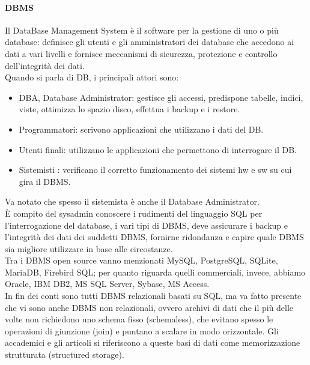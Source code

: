 \documentclass[a4paper]{report}
\begin{document}
\paragraph{DBMS} Il DataBase Management System è il software per la gestione di uno o più database: definisce gli utenti e gli amministratori dei database che accedono ai dati a vari livelli e fornisce meccanismi di sicurezza, protezione e controllo dell'integrità dei dati.\\
Quando si parla di DB, i principali attori sono:
\begin{itemize}
\item DBA, Database Administrator: gestisce gli accessi,
predispone tabelle, indici, viste, ottimizza lo spazio disco,
effettua i backup e i restore.
\item Programmatori: scrivono applicazioni che utilizzano i dati
del DB.
\item Utenti finali: utilizzano le applicazioni che permettono di
interrogare il DB.
\item Sistemisti : verificano il corretto funzionamento dei
sistemi hw e sw su cui gira il DBMS.
\end{itemize}
Va notato che spesso il sistemista è anche il Database Administrator.\\
È compito del sysadmin conoscere i rudimenti del linguaggio SQL per l'interrogazione del database, i vari tipi di DBMS, deve assicurare i backup e l'integrità dei dati dei suddetti DBMS, fornirne ridondanza e capire quale DBMS sia migliore utilizzare in base alle circostanze.\\
Tra i DBMS open source vanno menzionati MySQL, PostgreSQL, SQLite, MariaDB, Firebird SQL; per quanto riguarda quelli commerciali, invece, abbiamo Oracle, IBM DB2, MS SQL Server, Sybase, MS Access.\\
In fin dei conti sono tutti DBMS relazionali basati su SQL, ma va fatto presente che vi sono anche DBMS non relazionali, ovvero archivi di dati che il più delle volte non richiedono uno schema fisso (schemaless), che evitano spesso le operazioni di giunzione (join) e puntano a scalare in modo orizzontale. Gli accademici e gli articoli si riferiscono a queste basi di dati come memorizzazione strutturata (structured storage).\\
\end{document}
